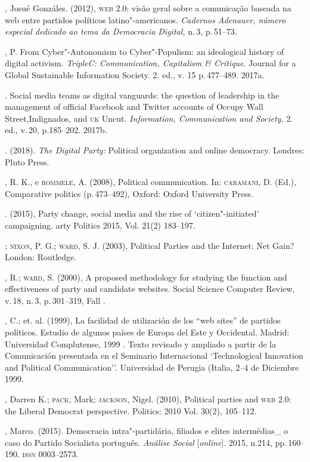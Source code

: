 \begin{bibliohedra}
, Josué Gonzáles. (2012), \textsc{web 2.0}: visão geral sobre a
comunicação baseada na web entre partidos políticos latino"-americanos.
\emph{Cadernos Adenauer, número especial dedicado ao tema da Democracia
Digital,} n.\,3, p.\,51--73.

, P. From Cyber"-Autonomism to Cyber"-Populism: an ideological
history of digital activism. \emph{TripleC: Communication, Capitalism \&
Critique}. Journal for a Global Sustainable Information Society. 2. ed.,
v. 15 p.\,477--489. 2017a.

\titidem. Social media teams as digital vanguards: the question of
leadership in the management of official Facebook and Twitter accounts
of Occupy Wall Street,Indignados, and \textsc{uk} Uncut. \emph{Information,
Communication and Society,} 2. ed., v.\,20, p.185--202. 2017b.

\titidem. (2018). \emph{The Digital Party:} Political organization
and online democracy. Londres: Pluto Press.

, R. K., e \textsc{rommele}, A. (2008), Political communication. In:
\textsc{caramani}, D. (Ed.), Comparative politics (p.\,473--492), Oxford: Oxford
University Press.

\titidem. (2015), Party change, social media and the rise of
`citizen"-initiated' campaigning. arty Politics 2015, Vol. 21(2)
183--197.

\titidem; \textsc{nixon}, P. G.; \textsc{ward}, S. J. (2003), Political Parties and the Internet: Net Gain? London: Routledge.

, R.; \textsc{ward}, S. (2000), A proposed methodology for studying the
function and effectiveness of party and candidate websites. Social
Science Computer Review, v.\,18, n.\,3, p.\,301--319, Fall .

, C.; et. al. (1999), La facilidad de utilización de los ``web
sites'' de partidos políticos. Estudio de algunos países de Europa del
Este y Occidental. Madrid: Universidad Complutense, 1999 . Texto
revisado y ampliado a partir de la Comunicación presentada en el
Seminario Internacional `Technological Innovation and Political
Communication''. Universidad de Perugia (Italia, 2--4 de Diciembre 1999.

, Darren K.; \textsc{pack}, Mark; \textsc{jackson}, Nigel. (2010), Political
parties and \textsc{web 2.0}: the Liberal Democrat perspective. Politics: 2010
Vol. 30(2), 105--112.

, Marco. (2015). Democracia intra"-partidária, filiados e elites
intermédias\_ o caso do Partido Socialista português. \emph{Análise
Social} {[}\emph{online}{]}. 2015, n.214, pp.\,160--190. \textsc{issn} 0003--2573.


\end{bibliohedra}
